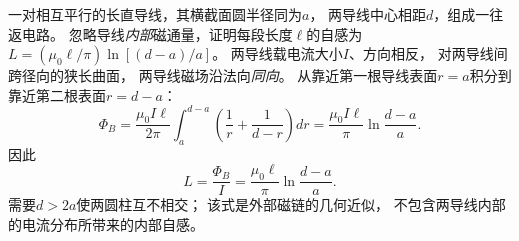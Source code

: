 \problemtext 一对相互平行的长直导线，其横截面圆半径同为$a$，
两导线中心相距$d$，组成一往返电路。
忽略导线\emph{内部}磁通量，证明每段长度$\ell$的自感为
$L=(\mu_0\ell/\pi)\ln[(d-a)/a]$。
\workings
两导线载电流大小$I$、方向相反，
对两导线间跨径向的狭长曲面，
两导线磁场沿法向\emph{同向}。
从靠近第一根导线表面$r=a$积分到
靠近第二根表面$r=d-a$：
\[
\Phi_B=\frac{\mu_0 I\ell}{2\pi}
\int_a^{d-a}\left(\frac1r+\frac1{d-r}\right)dr
=\frac{\mu_0I\ell}{\pi}\ln\frac{d-a}{a}.
\]
因此
\[
\boxed{L=\frac{\Phi_B}{I}
=\frac{\mu_0\ell}{\pi}\ln\frac{d-a}{a}}.
\]
\crosscheck 需要$d>2a$使两圆柱互不相交；
该式是外部磁链的几何近似，
不包含两导线内部的电流分布所带来的内部自感。
